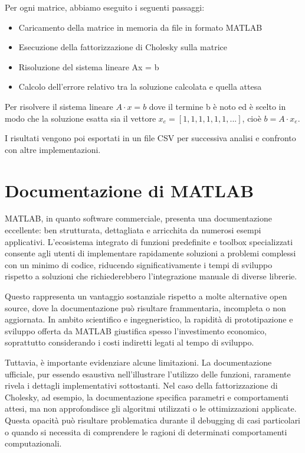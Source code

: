 Per ogni matrice, abbiamo eseguito i seguenti passaggi:

\begin{itemize}
    \item Caricamento della matrice in memoria da file in formato MATLAB
    \item Esecuzione della fattorizzazione di Cholesky sulla matrice
    \item Risoluzione del sistema lineare Ax = b
    \item Calcolo dell'errore relativo tra la soluzione calcolata e quella attesa
\end{itemize}

Per risolvere il sistema lineare $A \cdot x = b$ dove il termine b è noto ed è scelto in modo che la soluzione esatta
sia il vettore $x_e = [1, 1, 1, 1, 1, 1, ...]$, cioè $b = A \cdot x_e$.

I risultati vengono poi esportati in un file CSV per successiva analisi e confronto con altre implementazioni.

\section{Documentazione di MATLAB}

MATLAB, in quanto software commerciale, presenta una documentazione eccellente: ben strutturata, dettagliata e arricchita da numerosi 
esempi applicativi. L'ecosistema integrato di funzioni predefinite e toolbox specializzati consente agli utenti di implementare 
rapidamente soluzioni a problemi complessi con un minimo di codice, riducendo significativamente i tempi di sviluppo rispetto a 
soluzioni che richiederebbero l'integrazione manuale di diverse librerie.

Questo rappresenta un vantaggio sostanziale rispetto a molte alternative open source, dove la documentazione può risultare frammentaria, 
incompleta o non aggiornata. In ambito scientifico e ingegneristico, la rapidità di prototipazione e sviluppo offerta da MATLAB giustifica 
spesso l'investimento economico, soprattutto considerando i costi indiretti legati al tempo di sviluppo.

Tuttavia, è importante evidenziare alcune limitazioni. La documentazione ufficiale, pur essendo esaustiva nell'illustrare l'utilizzo delle 
funzioni, raramente rivela i dettagli implementativi sottostanti. Nel caso della fattorizzazione di Cholesky, ad esempio, 
la documentazione specifica parametri e comportamenti attesi, ma non approfondisce gli algoritmi utilizzati o le ottimizzazioni applicate.
Questa opacità può risultare problematica durante il debugging di casi particolari o quando si necessita di comprendere le ragioni di 
determinati comportamenti computazionali.

